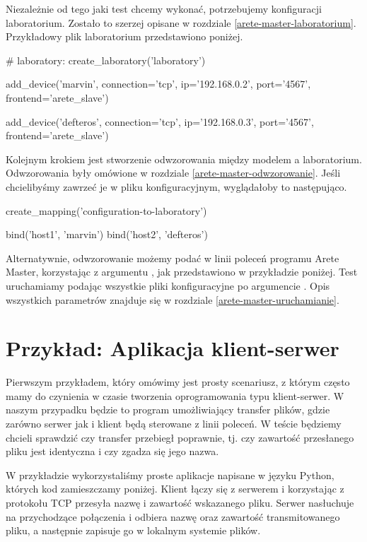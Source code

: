 \documentclass[00-praca-magisterska.tex]{subfiles}
\begin{document}
Niezależnie od tego jaki test chcemy wykonać, potrzebujemy konfiguracji
laboratorium. Zostało to szerzej opisane w rozdziale
\ref{arete-master-laboratorium}. Przykładowy plik laboratorium przedstawiono
poniżej. 

\begin{pythoncode}
  # laboratory:
  create_laboratory('laboratory')

  add_device('marvin',
      connection='tcp',
      ip='192.168.0.2',
      port='4567',
      frontend='arete_slave')

  add_device('defteros',
      connection='tcp',
      ip='192.168.0.3',
      port='4567',
      frontend='arete_slave')
\end{pythoncode}

Kolejnym krokiem jest stworzenie odwzorowania między modelem a laboratorium.
Odwzorowania były omówione w rozdziale \ref{arete-master-odwzorowanie}. 
Jeśli chcielibyśmy zawrzeć je w pliku konfiguracyjnym, wyglądałoby to
następująco.

\begin{pythoncode}
  create_mapping('configuration-to-laboratory')

  bind('host1', 'marvin')
  bind('host2', 'defteros')
\end{pythoncode}

Alternatywnie, odwzorowanie możemy podać w linii poleceń programu Arete Master,
korzystając z argumentu , jak przedstawiono w przykładzie poniżej.
Test uruchamiamy podając wszystkie pliki konfiguracyjne po argumencie .
Opis wszystkich parametrów znajduje się w rozdziale \ref{arete-master-uruchamianie}.


\section{Przykład: Aplikacja klient-serwer}
\label{example-client-server}

Pierwszym przykładem, który omówimy jest prosty scenariusz, z którym często mamy
do czynienia w czasie tworzenia oprogramowania typu klient-serwer. W naszym
przypadku będzie to program umożliwiający transfer plików, gdzie zarówno serwer
jak i klient będą sterowane z linii poleceń. W teście będziemy chcieli sprawdzić
czy transfer przebiegł poprawnie, tj. czy zawartość przesłanego pliku jest
identyczna i czy zgadza się jego nazwa.

W przykładzie wykorzystaliśmy proste aplikacje napisane w języku Python, których
kod zamieszczamy poniżej. Klient łączy się z serwerem i korzystając z protokołu
TCP przesyła nazwę i zawartość wskazanego pliku. Serwer nasłuchuje na
przychodzące połączenia i odbiera nazwę oraz zawartość transmitowanego pliku, a
następnie zapisuje go w lokalnym systemie plików.
\end{document}
